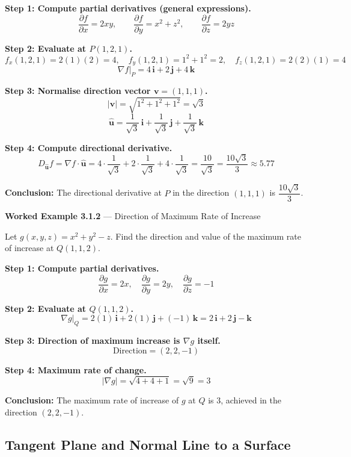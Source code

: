 \documentclass[12pt,a4paper]{article}
\begin{document}
\textbf{Step 1: Compute partial derivatives (general expressions).}
\[
  \frac{\partial f}{\partial x} = 2xy, \qquad
  \frac{\partial f}{\partial y} = x^2 + z^2, \qquad
  \frac{\partial f}{\partial z} = 2yz
\]

\textbf{Step 2: Evaluate at $P(1, 2, 1)$.}
\[
  f_x(1,2,1) = 2(1)(2) = 4, \quad
  f_y(1,2,1) = 1^2 + 1^2 = 2, \quad
  f_z(1,2,1) = 2(2)(1) = 4
\]
\[
  \nabla f\big|_P = 4\,\mathbf{i} + 2\,\mathbf{j} + 4\,\mathbf{k}
\]

\textbf{Step 3: Normalise direction vector $\mathbf{v} = (1,1,1)$.}
\[
  |\mathbf{v}| = \sqrt{1^2+1^2+1^2} = \sqrt{3}
\]
\[
  \hat{\mathbf{u}} = \frac{1}{\sqrt{3}}\,\mathbf{i} + \frac{1}{\sqrt{3}}\,\mathbf{j} + \frac{1}{\sqrt{3}}\,\mathbf{k}
\]

\textbf{Step 4: Compute directional derivative.}
\[
  D_{\hat{\mathbf{u}}} f = \nabla f \cdot \hat{\mathbf{u}}
    = 4 \cdot \frac{1}{\sqrt{3}} + 2 \cdot \frac{1}{\sqrt{3}} + 4 \cdot \frac{1}{\sqrt{3}}
    = \frac{10}{\sqrt{3}} = \frac{10\sqrt{3}}{3} \approx 5.77
\]

\textbf{Conclusion:} The directional derivative at $P$ in the direction $(1,1,1)$ is $\dfrac{10\sqrt{3}}{3}$.

\vspace{8pt}
\textbf{Worked Example 3.1.2} --- Direction of Maximum Rate of Increase

Let $g(x,y,z) = x^2 + y^2 - z$. Find the direction and value of the maximum rate of increase at $Q(1,1,2)$.

\textbf{Step 1: Compute partial derivatives.}
\[
  \frac{\partial g}{\partial x} = 2x, \quad \frac{\partial g}{\partial y} = 2y, \quad \frac{\partial g}{\partial z} = -1
\]

\textbf{Step 2: Evaluate at $Q(1,1,2)$.}
\[
  \nabla g\big|_Q = 2(1)\,\mathbf{i} + 2(1)\,\mathbf{j} + (-1)\,\mathbf{k} = 2\,\mathbf{i} + 2\,\mathbf{j} - \mathbf{k}
\]

\textbf{Step 3: Direction of maximum increase is $\nabla g$ itself.}
\[
  \text{Direction} = (2, 2, -1)
\]

\textbf{Step 4: Maximum rate of change.}
\[
  |\nabla g| = \sqrt{4 + 4 + 1} = \sqrt{9} = 3
\]

\textbf{Conclusion:} The maximum rate of increase of $g$ at $Q$ is $3$, achieved in the direction $(2, 2, -1)$.

\subsection{Tangent Plane and Normal Line to a Surface}
\end{document}
